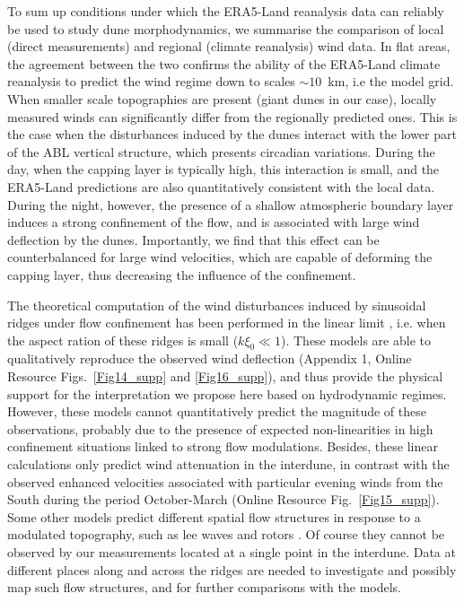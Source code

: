 To sum up conditions under which the ERA5-Land reanalysis data can reliably be used to study dune morphodynamics, we summarise the comparison of local (direct measurements) and regional (climate reanalysis) wind data. In flat areas, the agreement between the two confirms the ability of the ERA5-Land climate reanalysis to predict the wind regime down to scales $\sim10$~km, i.e the model grid. When smaller scale topographies are present (giant dunes in our case), locally measured winds can significantly differ from the regionally predicted ones. This is the case when the disturbances induced by the dunes interact with the lower part of the ABL vertical structure, which presents circadian variations. During the day, when the capping layer is typically high, this interaction is small, and the ERA5-Land predictions are also quantitatively consistent with the local data. During the night, however, the presence of a shallow atmospheric boundary layer induces a strong confinement of the flow, and is associated with large wind deflection by the dunes. Importantly, we find that this effect can be counterbalanced for large wind velocities, which are capable of deforming the capping layer, thus decreasing the influence of the confinement.

The theoretical computation of the wind disturbances induced by sinusoidal ridges under flow confinement has been performed in the linear limit \citep{Andreotti2009, Andreotti2012}, i.e. when the aspect ration of these ridges is small ($k\xi_0 \ll 1$). These models are able to qualitatively reproduce the observed wind deflection (Appendix 1, Online Resource Figs.~\ref{Fig14_supp} and \ref{Fig16_supp}), and thus provide the physical support for the interpretation we propose here based on hydrodynamic regimes. However, these models cannot quantitatively predict the magnitude of these observations, probably due to the presence of expected non-linearities in high confinement situations linked to strong flow modulations. Besides, these linear calculations only predict wind attenuation in the interdune, in contrast with the observed enhanced velocities associated with particular evening winds from the South during the period October-March (Online Resource Fig.~\ref{Fig15_supp}). Some other models predict different spatial flow structures in response to a modulated topography, such as lee waves and rotors \citep{baines1995, Vosper2004}. Of course they cannot be observed by our measurements located at a single point in the interdune. Data at different places along and across the ridges are needed to investigate and possibly map such flow structures, and for further comparisons with the models.


